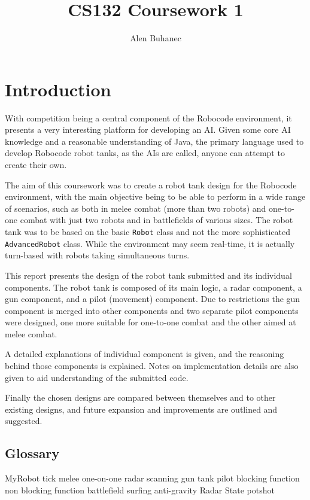 \documentclass[11pt]{report}
\title{CS132 Coursework 1}
\author{Alen Buhanec}
\date{}
\begin{document}
\maketitle
\tableofcontents
\chapter{Introduction} %
With competition being a central component of the Robocode environment, it presents a very interesting platform for developing an AI. Given some core AI knowledge and a reasonable understanding of Java, the primary language used to develop Robocode robot tanks, as the AIs are called, anyone can attempt to create their own.

The aim of this coursework was to create a robot tank design for the Robocode environment, with the main objective being to be able to perform in a wide range of scenarios, such as both in melee combat (more than two robots) and one-to-one combat with just two robots and in battlefields of various sizes. The robot tank was to be based on the basic \texttt{Robot} class and not the more sophisticated \texttt{AdvancedRobot} class. While the environment may seem real-time, it is actually turn-based with robots taking simultaneous turns. %

This report presents the design of the robot tank submitted and its individual components. The robot tank is composed of its main logic, a radar component, a gun component, and a pilot (movement) component. Due to restrictions the gun component is merged into other components and two separate pilot components were designed, one more suitable for one-to-one combat and the other aimed at melee combat.

A detailed explanations of individual component is given, and the reasoning behind those components is explained. Notes on implementation details are also given to aid understanding of the submitted code.

Finally the chosen designs are compared between themselves and to other existing designs, and future expansion and improvements are outlined and suggested.

\section{Glossary}
MyRobot
tick
melee
one-on-one
radar
scanning
gun
tank
pilot
blocking function
non blocking function
battlefield
surfing
anti-gravity
Radar
State
potshot
\end{document}

